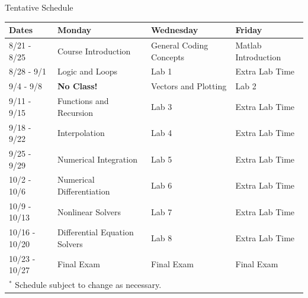 {}\documentclass[letterpaper,
compress,
xcolor=x11names,
]{beamer}
\begin{document}
\begin{frame}{Tentative Schedule}
	\tiny
	
	\begin{center}
		\begin{tabular}{l || l | l | l }
			\toprule
			\textbf{Dates} & \textbf{Monday} & \textbf{Wednesday} & \textbf{Friday}\\
			\midrule
			8/21  - 8/25  & Course Introduction           & General Coding Concepts & Matlab Introduction  \\
			8/28  - 9/1   & Logic and Loops               & Lab 1                   & Extra Lab Time       \\
			9/4   - 9/8   & \textbf{No Class!}            & Vectors and Plotting    & Lab 2                \\
			9/11  - 9/15  & Functions and Recursion       & Lab 3                   & Extra Lab Time       \\
			9/18  - 9/22  & Interpolation                 & Lab 4                   & Extra Lab Time       \\
			9/25  - 9/29  & Numerical Integration         & Lab 5                   & Extra Lab Time       \\
			10/2  - 10/6  & Numerical Differentiation     & Lab 6                   & Extra Lab Time       \\
			10/9  - 10/13 & Nonlinear Solvers             & Lab 7                   & Extra Lab Time       \\
			10/16 - 10/20 & Differential Equation Solvers & Lab 8                   & Extra Lab Time       \\
			10/23 - 10/27 & Final Exam                    & Final Exam              & Final Exam           \\
			\bottomrule
			\multicolumn{4}{l}{$^{*}$ Schedule subject to change as necessary.}\\
		\end{tabular}
	\end{center}
\end{frame}
\end{document}
